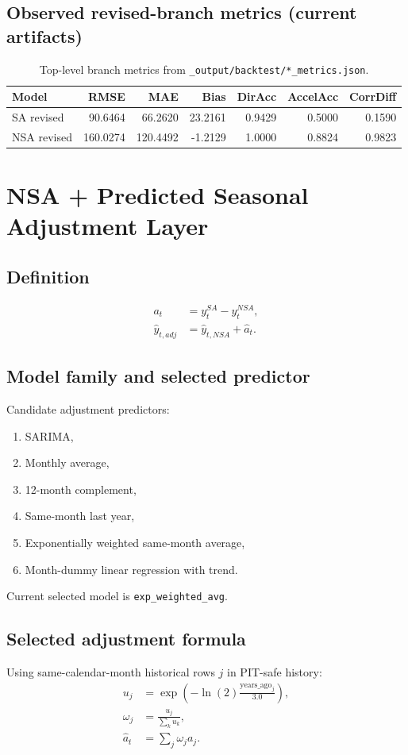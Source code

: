 \documentclass[11pt]{article}
\begin{document}
\subsection{Observed revised-branch metrics (current artifacts)}
\begin{table}[h!]
\centering
\begin{tabular}{lrrrrrr}
\toprule
Model & RMSE & MAE & Bias & DirAcc & AccelAcc & CorrDiff \\
\midrule
SA revised & 90.6464 & 66.2620 & 23.2161 & 0.9429 & 0.5000 & 0.1590 \\
NSA revised & 160.0274 & 120.4492 & -1.2129 & 1.0000 & 0.8824 & 0.9823 \\
\bottomrule
\end{tabular}
\caption{Top-level branch metrics from \texttt{\_output/backtest/*\_metrics.json}.}
\end{table}

\section{NSA + Predicted Seasonal Adjustment Layer}
\subsection{Definition}
\begin{align}
a_t &= y_t^{SA}-y_t^{NSA}, \\
\hat{y}_{t,adj} &= \hat{y}_{t,NSA}+\hat{a}_t.
\end{align}

\subsection{Model family and selected predictor}
Candidate adjustment predictors:
\begin{enumerate}
    \item SARIMA,
    \item Monthly average,
    \item 12-month complement,
    \item Same-month last year,
    \item Exponentially weighted same-month average,
    \item Month-dummy linear regression with trend.
\end{enumerate}
Current selected model is \texttt{exp\_weighted\_avg}.

\subsection{Selected adjustment formula}
Using same-calendar-month historical rows $j$ in PIT-safe history:
\begin{align}
u_j &= \exp\left(-\ln(2)\frac{\text{years\_ago}_j}{3.0}\right),\\
\omega_j &= \frac{u_j}{\sum_k u_k},\\
\hat{a}_t &= \sum_j \omega_j a_j.
\end{align}
\end{document}
